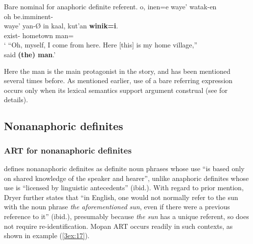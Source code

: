 \documentclass[output=paper]{langsci/langscibook}
\begin{document}
\begin{exe}
\ex\label{3ex:16}
Bare nominal for anaphoric definite referent.  
\exi{}
\gll	o,    	inen=e 			waye’           	watak-en \\
	oh     {}	{}	be.imminent-{} \\
\glt
\exi{}
\gll	waye'           	yan-{\O}          	in     		kaal,			kut'an		{\bf{winik=i}}. \\
	{}	exist-{}	{}	hometown		{}	man={} \\
\glt	` ``Oh, myself, I come from here. Here [this] is my home village,''\\said {\bf{(the) man}}.'
\end{exe}

Here the man is the main protagonist in the story, and has been mentioned several times before.  As mentioned earlier, use of a bare referring expression occurs only when its lexical semantics support argument construal (see \citealt{contini:morava:danziger:fc} for details).


\subsection{Nonanaphoric definites}\label{3sec:32}

\subsubsection{ART for nonanaphoric definites}\label{3sec:321}

\cite[][e236]{dryer:14} defines nonanaphoric definites as definite noun phrases whose use ``is based only on shared knowledge of the speaker and hearer'', unlike anaphoric definites whose use is ``licensed by linguistic antecedents'' (ibid.).  With regard to prior mention, Dryer further states that ``in English, one would not normally refer to the sun with the noun phrase {\emph{the aforementioned sun}}, even if there were a previous reference to it'' (ibid.), presumably because {\emph{the sun}} has a unique referent, so does not require re-identification.  Mopan ART occurs readily in such contexts, as shown in example (\ref{3ex:17}).
\end{document}
